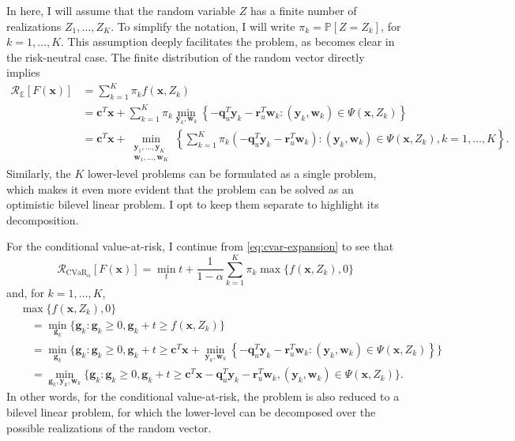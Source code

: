 \documentclass[12pt]{article}
\begin{document}
In here, I will assume that the random variable $Z$ has a finite number of realizations $Z_1,\ldots,Z_K$.
To simplify the notation, I will write $\pi_k=\mathbb{P}[Z=Z_k]$, for $k=1,\ldots,K$.
This assumption deeply facilitates the problem, as becomes clear in the risk-neutral case.
The finite distribution of the random vector directly implies~\citep[Theorem 5.1]{burtscheidtBilevelLinearOptimization2020}
\begin{align*}
    \mathcal{R}_{\mathbb{E}}[F(\bm{x})] &= \sum_{k=1}^{K} \pi_k f(\bm{x},Z_k) \\
    &= \bm{c}^{T}\bm{x} + \sum_{k=1}^{K} \pi_k \min_{\bm{y}_{k},\bm{w}_{k}}\left\{ -\bm{q}^{T}_u \bm{y}_{k} -\bm{r}^{T}_u \bm{w}_{k} : (\bm{y}_{k},\bm{w}_{k})\in \Psi(\bm{x},Z_k) \right\} \\
&= \bm{c}^{T}\bm{x} + \min_{\substack{\bm{y}_{1},\ldots,\bm{y}_{K} \\ \bm{w}_{1},\ldots,\bm{w}_{K}}}\left\{ \sum_{k=1}^{K} \pi_k (-\bm{q}^{T}_u \bm{y}_{k} -\bm{r}^{T}_u \bm{w}_{k}) : (\bm{y}_{k},\bm{w}_{k})\in \Psi(\bm{x},Z_k), k=1,\ldots,K \right\}
.\end{align*}
Similarly, the $K$ lower-level problems can be formulated as a single problem, which makes it even more evident that the problem can be solved as an optimistic bilevel linear problem.
I opt to keep them separate to highlight its decomposition.

For the conditional value-at-risk, I continue from \eqref{eq:cvar-expansion} to see that~\citep[Theorems 5.3 and 5.7]{burtscheidtRiskAverseModelsBilevel2019} \[
    \mathcal{R}_{\text{CVaR}_{\alpha}}[F(\bm{x})] = \min_{t} t + \frac{1}{1-\alpha} \sum_{k=1}^{K} \pi_k \max\{f(\bm{x},Z_k),0\}
\] 
and, for $k=1,\ldots,K$,
\begin{align*}
    &\max\{f(\bm{x},Z_k),0\} \\
    &\quad= \min_{\bm{g}_k} \{\bm{g}_k : \bm{g}_k \ge 0, \bm{g}_k+t \ge f(\bm{x},Z_k)\} \\
&\quad= \min_{\bm{g}_k} \{\bm{g}_k : \bm{g}_k \ge 0, \bm{g}_k+t \ge \bm{c}^{T}\bm{x} + \min_{\bm{y}_k,\bm{w}_k}\left\{ -\bm{q}^{T}_u \bm{y}_{k} -\bm{r}^{T}_u \bm{w}_{k} : (\bm{y}_{k},\bm{w}_{k})\in \Psi(\bm{x},Z_k) \right\} \} \\
    &\quad= \min_{\bm{g}_k,\bm{y}_{k},\bm{w}_{k}} \{\bm{g}_k : \bm{g}_k \ge 0, \bm{g}_k+t \ge \bm{c}^{T}\bm{x} -\bm{q}^{T}_u \bm{y}_{k} -\bm{r}^{T}_u \bm{w}_{k} , (\bm{y}_{k},\bm{w}_{k})\in \Psi(\bm{x},Z_k) \}
.\end{align*}
In other words, for the conditional value-at-risk, the problem is also reduced to a bilevel linear problem, for which the lower-level can be decomposed over the possible realizations of the random vector.
\end{document}
